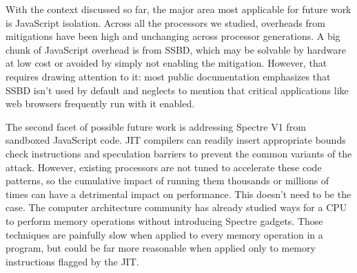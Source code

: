 With the context discussed so far, the major area most applicable for future work is JavaScript isolation.
Across all the processors we studied, overheads from mitigations have been high and unchanging across processor generations.
A big chunk of JavaScript overhead is from SSBD, which may be solvable by hardware at low cost or avoided by simply not enabling the mitigation.
However, that requires drawing attention to it: most public documentation emphasizes that SSBD isn't used by default and neglects to mention that critical applications like web browsers frequently run with it enabled.

The second facet of possible future work is addressing Spectre V1 from sandboxed JavaScript code.
JIT compilers can readily insert appropriate bounds check instructions and speculation barriers to prevent the common variants of the attack.
However, existing processors are not tuned to accelerate these code patterns, so the cumulative impact of running them thousands or millions of times can have a detrimental impact on performance.
This doesn't need to be the case.
The computer architecture community has already studied ways for a CPU to perform memory operations without introducing Spectre gadgets.
Those techniques are painfully slow when applied to every memory operation in a program, but could be far more reasonable when applied only to memory instructions flagged by the JIT.
